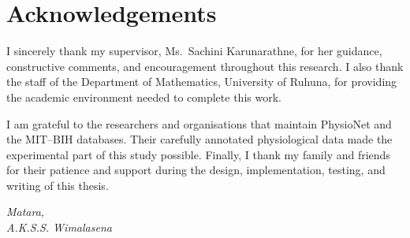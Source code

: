 \chapter*{Acknowledgements}\label{ack}
{}%
%
%
\prevspace
%
I sincerely thank my supervisor, Ms.\ Sachini Karunarathne, for her guidance,
constructive comments, and encouragement throughout this research.
I also thank the staff of the Department of Mathematics, University of Ruhuna,
for providing the academic environment needed to complete this work.

I am grateful to the researchers and organisations that maintain PhysioNet and
the MIT--BIH databases. Their carefully annotated physiological data made the
experimental part of this study possible. Finally, I thank my family and
friends for their patience and support during the design, implementation,
testing, and writing of this thesis.

\vfill
\begin{flushright}
\textit{
	Matara, \monthyeardate \\
	A.K.S.S. Wimalasena
}
\end{flushright}
